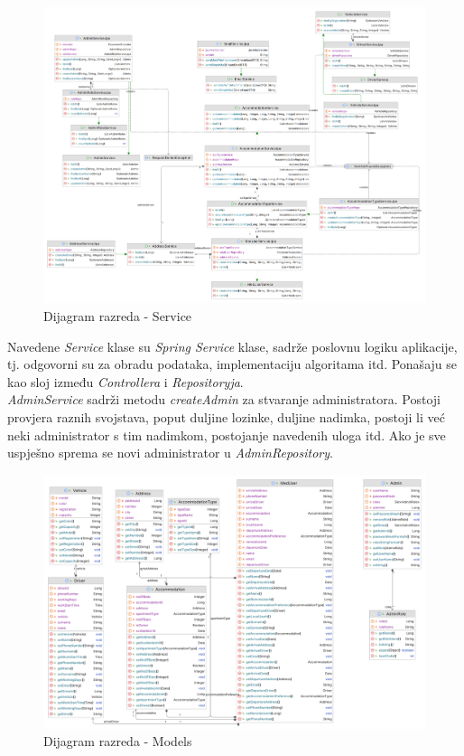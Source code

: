 			\begin{figure}[H]
				\includegraphics[width=\textwidth]{slike/service.PNG}
				\caption{Dijagram razreda - Service}
				\label{serviceDiagram}
			\end{figure}
			
			{Navedene \textit{Service} klase su \textit{Spring Service} klase, sadrže poslovnu logiku aplikacije, tj. odgovorni su za obradu podataka, implementaciju algoritama itd. Ponašaju se kao sloj između \textit{Controllera} i \textit{Repositoryja}.\\
			\textit{AdminService} sadrži metodu \textit{createAdmin} za stvaranje administratora. Postoji provjera raznih svojstava, poput duljine lozinke, duljine nadimka, postoji li već neki administrator s tim nadimkom, postojanje navedenih uloga itd. Ako je sve uspješno sprema se novi administrator u \textit{AdminRepository}.}\\
			
			\begin{figure}[H]
				\includegraphics[width=\textwidth]{slike/domain.PNG}
				\caption{Dijagram razreda - Models}
				\label{domainDiagram}
			\end{figure}
			
